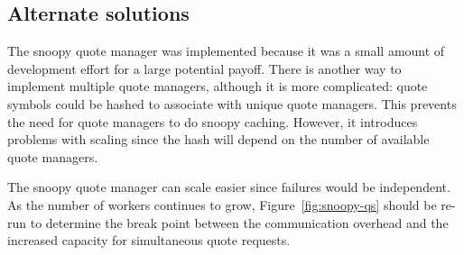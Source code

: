 \subsection{Alternate solutions}
The snoopy quote manager was implemented because it was a small amount of development effort for a large potential payoff.
There is another way to implement multiple quote managers, although it is more complicated: quote symbols could be hashed to associate with unique quote managers.
This prevents the need for quote managers to do snoopy caching.
However, it introduces problems with scaling since the hash will depend on the number of available quote managers.

The snoopy quote manager can scale easier since failures would be independent.
As the number of workers continues to grow, Figure~\ref{fig:snoopy-qs} should be re-run to determine the break point between the communication overhead and the increased capacity for simultaneous quote requests.

